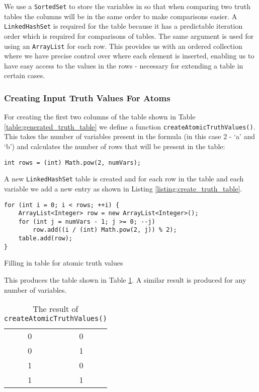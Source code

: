 \documentclass{report}
\begin{document}
We use a {\tt SortedSet} to store the variables in so that when comparing two truth tables the columns will be in the same order to make comparisons easier. A {\tt LinkedHashSet} is required for the table because it has a predictable iteration order which is required for comparisons of tables. The same argument is used for using an {\tt ArrayList} for each row. This provides us with an ordered collection where we have precise control over where each element is inserted, enabling us to have easy access to the values in the rows - necessary for extending a table in certain cases.

\subsubsection{Creating Input Truth Values For Atoms}

For creating the first two columns of the table shown in Table \ref{table:generated_truth_table} we define a function {\tt createAtomicTruthValues()}. This takes the number of variables present in the formula (in this case 2 - `a' and `b') and calculates the number of rows that will be present in the table:

\begin{listing}[ht]
\begin{verbatim} 
int rows = (int) Math.pow(2, numVars);
\end{verbatim}
\end{listing}

A new {\tt LinkedHashSet} table is created and for each row in the table and each variable we add a new entry as shown in Listing \ref{listing:create_truth_table}.

\begin{listing}[ht]
\begin{verbatim} 
for (int i = 0; i < rows; ++i) {
    ArrayList<Integer> row = new ArrayList<Integer>();
    for (int j = numVars - 1; j >= 0; --j)
        row.add((i / (int) Math.pow(2, j)) % 2);
    table.add(row);
}
\end{verbatim}
\caption{Filling in table for atomic truth values}
\label{listing:create_truth_table}
\end{listing}

This produces the table shown in Table \ref{table:generated_atomic_truth_values}. A similar result is produced for any number of variables.

\begin{table}[h]
  \begin{center}
    \begin{tabular}{ || c | c || }
      \hline
      0 & 0 \\
      0 & 1 \\
      1 & 0 \\
      1 & 1 \\
      \hline
    \end{tabular}
  \end{center}
  \caption{The result of {\tt createAtomicTruthValues()}}
  \label{table:generated_atomic_truth_values}
\end{table}
\end{document}
